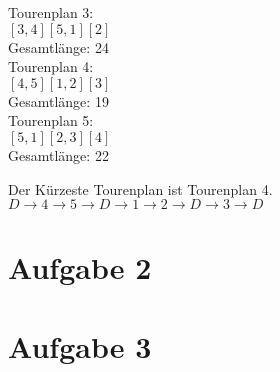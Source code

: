 \documentclass[a4paper,11pt]{article}
\begin{document}
Tourenplan 3: \\
$[3,4][5,1][2]$ \\
Gesamtlänge: 24 \\

Tourenplan 4: \\
$[4,5][1,2][3]$ \\
Gesamtlänge: 19 \\

Tourenplan 5: \\
$[5,1][2,3][4]$ \\
Gesamtlänge: 22 \newline

Der Kürzeste Tourenplan ist Tourenplan 4. \\
$D \to 4 \to 5 \to D \to 1 \to 2 \to D \to 3 \to D$

\section*{Aufgabe 2}

\section*{Aufgabe 3}
\end{document}
